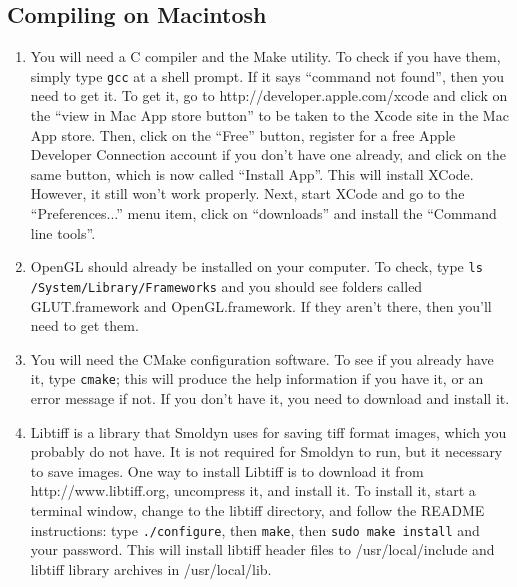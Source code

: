 \documentclass {scrbook}
\newcommand {\ttt} {\texttt}
\begin{document}
\subsection*{Compiling on Macintosh}
\begin{enumerate}
\item You will need a C compiler and the Make utility. To check if you have them, simply type \ttt{gcc} at a shell prompt. If it says ``command not found'', then you need to get it. To get it, go to http://developer.apple.com/xcode and click on the ``view in Mac App store button'' to be taken to the Xcode site in the Mac App store. Then, click on the ``Free'' button, register for a free Apple Developer Connection account if you don't have one already, and click on the same button, which is now called ``Install App''. This will install XCode. However, it still won't work properly. Next, start XCode and go to the ``Preferences...'' menu item, click on ``downloads'' and install the ``Command line tools''.

\item OpenGL should already be installed on your computer. To check, type \ttt{ls /System/Library/Frameworks} and you should see folders called GLUT.framework and OpenGL.framework. If they aren't there, then you'll need to get them.

\item You will need the CMake configuration software. To see if you already have it, type \ttt{cmake}; this will produce the help information if you have it, or an error message if not. If you don't have it, you need to download and install it.

\item Libtiff is a library that Smoldyn uses for saving tiff format images, which you probably do not have. It is not required for Smoldyn to run, but it necessary to save images. One way to install Libtiff is to download it from http://www.libtiff.org, uncompress it, and install it. To install it, start a terminal window, change to the libtiff directory, and follow the README instructions: type \ttt{./configure}, then \ttt{make}, then \ttt{sudo make install} and your password. This will install libtiff header files to /usr/local/include and libtiff library archives in /usr/local/lib.


\end{enumerate}
\end{document}
